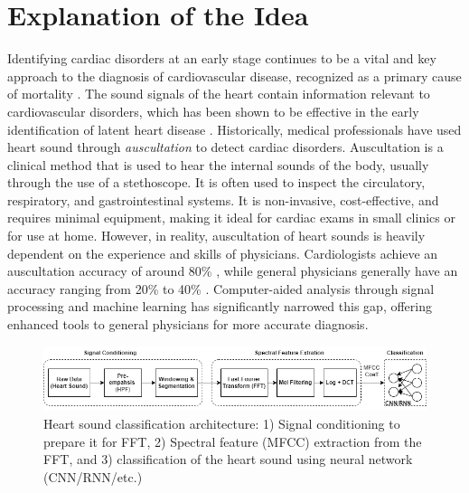 \documentclass[12pt]{article}
\begin{document}
\section{Explanation of the Idea}


Identifying cardiac disorders at an early stage continues to be a vital and key approach to the diagnosis of cardiovascular disease, recognized as a primary cause of mortality \cite{members2016heart}.  
The sound signals of the heart contain information relevant to cardiovascular disorders, which has been shown to be effective in the early identification of latent heart disease \cite{yuenyong2011framework}. Historically, medical professionals have used heart sound through \textit{auscultation} to detect cardiac disorders.
Auscultation is a clinical method that is used to hear the internal sounds of the body, usually through the use of a stethoscope. It is often used to inspect the circulatory, respiratory, and gastrointestinal systems.
It is non-invasive, cost-effective, and requires minimal equipment, making it ideal for cardiac exams in small clinics or for use at home.
However, in reality, auscultation of heart sounds is heavily dependent on the experience and skills of physicians.
Cardiologists achieve an auscultation accuracy of around 80\% \cite{strunic2007detection}, while general physicians generally have an accuracy ranging from 20\% to 40\% \cite{lam2018factors}. Computer-aided analysis through signal processing and machine learning has significantly narrowed this gap, offering enhanced tools to general physicians for more accurate diagnosis.

\begin{figure}[htbp]	
    \includegraphics[width=1.0\textwidth]{figs/HSC-arch.png}
    \caption{Heart sound classification architecture: 1) Signal conditioning to prepare it for FFT, 2) Spectral feature (MFCC) extraction from the FFT, and 3) classification of the heart sound using neural network (CNN/RNN/etc.)}
    \label{fig:arch-heart-sound}
\end{figure}
\end{document}
